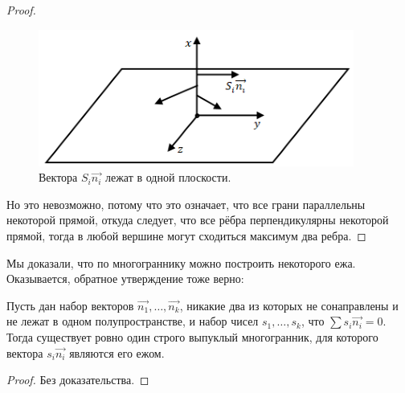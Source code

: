 \begin{proof}
    \begin{figure}[ht]
        \centering
        \includegraphics[scale=0.8]{images/c7.7.png}
        \caption{Вектора $S_i \overrightarrow{n_i}$ лежат в одной плоскости.}
        \label{fig:c7.7}
    \end{figure}

    Но это невозможно, потому что это означает, что все грани параллельны некоторой прямой, откуда следует, что все рёбра перпендикулярны некоторой прямой, тогда в любой вершине могут сходиться максимум два ребра.
\end{proof} 

Мы доказали, что по многограннику можно построить некоторого ежа. Оказывается, обратное утверждение тоже верно:

\begin{theorem}[Минковский]
    Пусть дан набор векторов $\overrightarrow{n_1}, \dots, \overrightarrow{n_k}$, никакие два из которых не сонаправлены и не лежат в одном полупространстве, и набор чисел $s_1, \dots, s_k$, что $\sum s_i \overrightarrow{n_i} = 0$. Тогда существует ровно один строго выпуклый многогранник, для которого вектора $s_i \overrightarrow{n_i}$ являются его ежом.
\end{theorem}
\begin{proof}
    Без доказательства.
\end{proof}